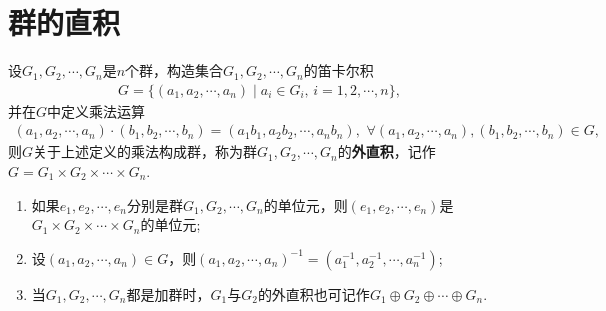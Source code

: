 \documentclass[../../main.tex]{subfiles}%
\begin{document}
\section{群的直积}

\begin{definition}[外直积]
设$G_1, G_2,\cdots,G_n$是$n$个群，构造集合$G_1,G_2,\cdots,G_n$的笛卡尔积
\begin{align*}
G=\{(a_1,a_2,\cdots ,a_n)\mid a_i\in G_i,\,i=1,2,\cdots ,n\},
\end{align*}
并在$G$中定义乘法运算
\begin{align*}
(a_1,a_2,\cdots ,a_n)\cdot (b_1,b_2,\cdots ,b_n)=(a_1b_1,a_2b_2,\cdots ,a_nb_n),\,\,\forall (a_1,a_2,\cdots ,a_n),(b_1,b_2,\cdots ,b_n)\in G,
\end{align*}
则$G$关于上述定义的乘法构成群，称为群$G_1,G_2,\cdots,G_n$的\textbf{外直积}，记作$G = G_1 \times G_2\times \cdots \times G_n$.
\end{definition}
\begin{remark}
\begin{enumerate}[(1)]
\item 如果$e_1, e_2,\cdots,e_n$分别是群$G_1,G_2,\cdots,G_n$的单位元，则$(e_1,e_2,\cdots,e_n)$是$G_1 \times G_2\times \cdots\times G_n$的单位元;

\item 设$(a_1,a_2,\cdots,a_n) \in G$，则$(a_1,a_2,\cdots,a_n)^{-1} = (a_1^{-1}, a_2^{-1},\cdots,a_n^{-1})$;

\item 当$G_1,G_2,\cdots,G_n$都是加群时，$G_1$与$G_2$的外直积也可记作$G_1 \oplus G_2 \oplus\cdots \oplus G_n$.
\end{enumerate}
\end{remark}
\end{document}
